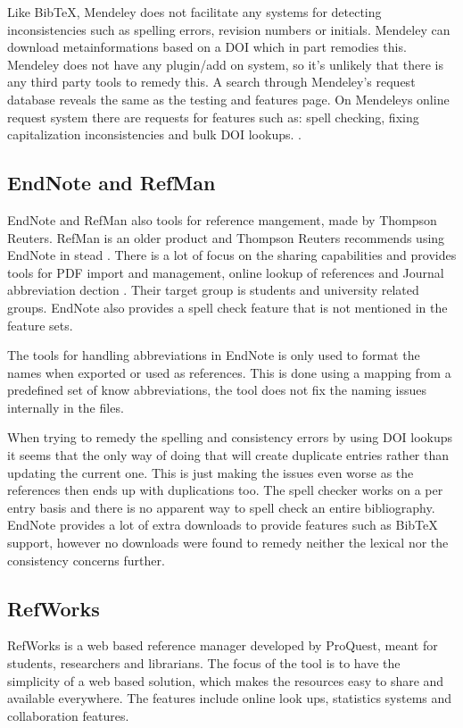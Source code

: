 Like BibTeX, Mendeley does not facilitate any systems for detecting
inconsistencies such as spelling errors, revision numbers or initials.
Mendeley can download metainformations based on a DOI which in part
remodies this.  Mendeley does not have any plugin/add on system, so
it's unlikely that there is any third party tools to remedy this. A
search through Mendeley's request database reveals the same as the
testing and features page.  On Mendeleys online request system there
are requests for features such as: spell checking, fixing
capitalization inconsistencies and bulk DOI lookups.
\cite{mendeley_request_spellcheck, mendeley_request_lowercase,
  mendeley_request_capitalization, mendeley_request_bulk_doi}.

\subsection{EndNote and RefMan}
EndNote and RefMan also tools for reference mangement, made by
Thompson Reuters.  RefMan is an older product and Thompson Reuters
recommends using EndNote in stead \cite{refman_switch,
  refman_features}.  There is a lot of focus on the sharing
capabilities and provides tools for PDF import and management, online
lookup of references and Journal abbreviation dection
\cite{endnote_basic_features, endnote_x7_features}.  Their target
group is students and university related groups.  EndNote also
provides a spell check feature that is not mentioned in the feature
sets\cite{endnote_spellcheck}.

The tools for handling abbreviations in EndNote is only used to format
the names when exported or used as references.  This is done using a
mapping from a predefined set of know abbreviations, the tool does not
fix the naming issues internally in the
files\cite{endnote_terms_journals}.

When trying to remedy the spelling and consistency errors by using DOI
lookups it seems that the only way of doing that will create duplicate
entries rather than updating the current one. This is just making the
issues even worse as the references then ends up with duplications
too.  The spell checker works on a per entry basis and there is no
apparent way to spell check an entire bibliography.  EndNote provides
a lot of extra downloads to provide features such as Bib{\TeX}
support, however no downloads were found to remedy neither the lexical
nor the consistency concerns further\cite{endnote_downloads}.

\subsection{RefWorks}
RefWorks is a web based reference manager developed by ProQuest, meant
for students, researchers and librarians.  The focus of the tool is to
have the simplicity of a web based solution, which makes the resources
easy to share and available everywhere.  The features include online
look ups, statistics systems and collaboration
features\cite{refworks_features}.

